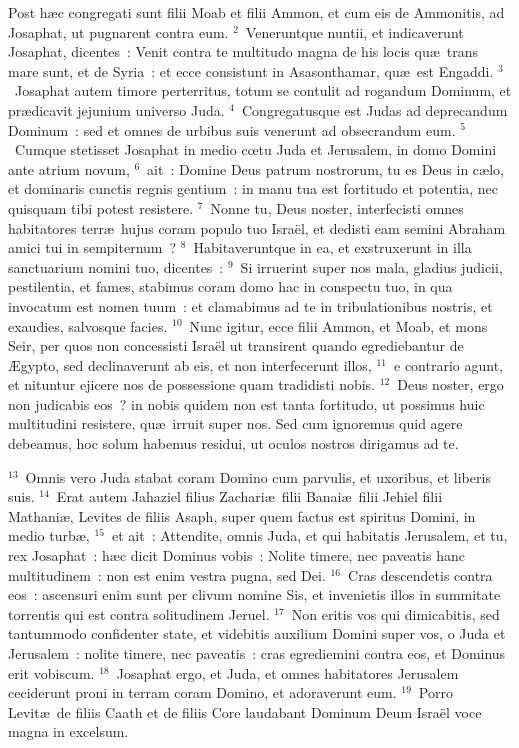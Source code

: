 \lettrine[lines=10,image=true,loversize=0.05,lraise=-0.03]{P}{}ost h\ae c congregati sunt filii Moab et filii Ammon, et cum eis de Ammonitis, ad Josaphat, ut pugnarent contra eum.
${}^{2}$~Veneruntque nuntii, et indicaverunt Josaphat, dicentes~: Venit contra te multitudo magna de his locis qu\ae\ trans mare sunt, et de Syria~: et ecce consistunt in Asasonthamar, qu\ae\ est Engaddi.
${}^{3}$~Josaphat autem timore perterritus, totum se contulit ad rogandum Dominum, et pr\ae dicavit jejunium universo Juda.
${}^{4}$~Congregatusque est Judas ad deprecandum Dominum~: sed et omnes de urbibus suis venerunt ad obsecrandum eum.
${}^{5}$~Cumque stetisset Josaphat in medio cœtu Juda et Jerusalem, in domo Domini ante atrium novum,
${}^{6}$~ait~: Domine Deus patrum nostrorum, tu es Deus in c\ae lo, et dominaris cunctis regnis gentium~: in manu tua est fortitudo et potentia, nec quisquam tibi potest resistere.
${}^{7}$~Nonne tu, Deus noster, interfecisti omnes habitatores terr\ae\ hujus coram populo tuo Isra\"el, et dedisti eam semini Abraham amici tui in sempiternum~?
${}^{8}$~Habitaveruntque in ea, et exstruxerunt in illa sanctuarium nomini tuo, dicentes~:
${}^{9}$~Si irruerint super nos mala, gladius judicii, pestilentia, et fames, stabimus coram domo hac in conspectu tuo, in qua invocatum est nomen tuum~: et clamabimus ad te in tribulationibus nostris, et exaudies, salvosque facies.
${}^{10}$~Nunc igitur, ecce filii Ammon, et Moab, et mons Seir, per quos non concessisti Isra\"el ut transirent quando egrediebantur de \AE gypto, sed declinaverunt ab eis, et non interfecerunt illos,
${}^{11}$~e contrario agunt, et nituntur ejicere nos de possessione quam tradidisti nobis.
${}^{12}$~Deus noster, ergo non judicabis eos~? in nobis quidem non est tanta fortitudo, ut possimus huic multitudini resistere, qu\ae\ irruit super nos. Sed cum ignoremus quid agere debeamus, hoc solum habemus residui, ut oculos nostros dirigamus ad te.


${}^{13}$~Omnis vero Juda stabat coram Domino cum parvulis, et uxoribus, et liberis suis.
${}^{14}$~Erat autem Jahaziel filius Zachari\ae\ filii Banai\ae\ filii Jehiel filii Mathani\ae , Levites de filiis Asaph, super quem factus est spiritus Domini, in medio turb\ae ,
${}^{15}$~et ait~: Attendite, omnis Juda, et qui habitatis Jerusalem, et tu, rex Josaphat~: h\ae c dicit Dominus vobis~: Nolite timere, nec paveatis hanc multitudinem~: non est enim vestra pugna, sed Dei.
${}^{16}$~Cras descendetis contra eos~: ascensuri enim sunt per clivum nomine Sis, et invenietis illos in summitate torrentis qui est contra solitudinem Jeruel.
${}^{17}$~Non eritis vos qui dimicabitis, sed tantummodo confidenter state, et videbitis auxilium Domini super vos, o Juda et Jerusalem~: nolite timere, nec paveatis~: cras egrediemini contra eos, et Dominus erit vobiscum.
${}^{18}$~Josaphat ergo, et Juda, et omnes habitatores Jerusalem ceciderunt proni in terram coram Domino, et adoraverunt eum.
${}^{19}$~Porro Levit\ae\ de filiis Caath et de filiis Core laudabant Dominum Deum Isra\"el voce magna in excelsum.


